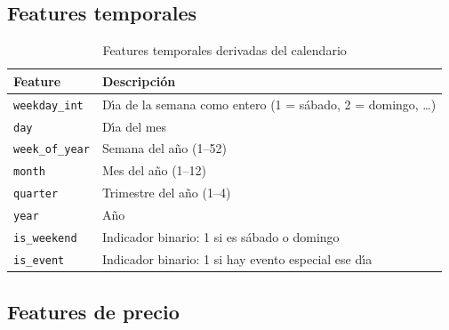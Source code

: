 \documentclass[12pt, a4paper, oneside]{report}
\newcommand{\code}[1]{\texttt{\small\color{codeblue}#1}}
\begin{document}
\subsection{Features temporales}

\begin{table}[H]
  \centering
  \caption{Features temporales derivadas del calendario}
  \label{tab:temporal_features}
  \begin{tabularx}{\textwidth}{L{3.8cm} X}
    \toprule
    {\color{white}\textbf{Feature}} & {\color{white}\textbf{Descripci\'on}} \\
    \midrule
       \code{weekday\_int}     & D\'{\i}a de la semana como entero (1 = s\'abado, 2 = domingo, \ldots) \\
      \code{day}              & D\'{\i}a del mes \\
       \code{week\_of\_year}   & Semana del a\~no (1--52) \\
      \code{month}            & Mes del a\~no (1--12) \\
       \code{quarter}          & Trimestre del a\~no (1--4) \\
      \code{year}             & A\~no \\
       \code{is\_weekend}      & Indicador binario: 1 si es s\'abado o domingo \\
      \code{is\_event}        & Indicador binario: 1 si hay evento especial ese d\'{\i}a \\
    \bottomrule
  \end{tabularx}
\end{table}

\subsection{Features de precio}
\end{document}
